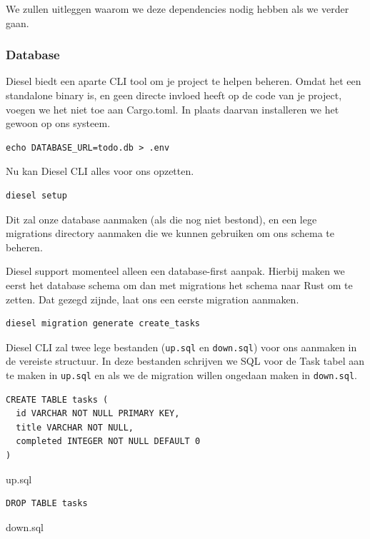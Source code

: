 We zullen uitleggen waarom we deze dependencies nodig hebben als we verder gaan.

\subsubsection{Database}

Diesel biedt een aparte CLI tool om je project te helpen beheren. Omdat het een standalone binary
is, en geen directe invloed heeft op de code van je project, voegen we het niet toe aan Cargo.toml.
In plaats daarvan installeren we het gewoon op ons systeem.

\begin{verbatim}
echo DATABASE_URL=todo.db > .env
\end{verbatim}

Nu kan Diesel CLI alles voor ons opzetten.

\begin{verbatim}
diesel setup
\end{verbatim}

Dit zal onze database aanmaken (als die nog niet bestond), en een lege migrations directory aanmaken
die we kunnen gebruiken om ons schema te beheren.

Diesel support momenteel alleen een database-first aanpak. Hierbij maken we eerst het database
schema om dan met migrations het schema naar Rust om te zetten. Dat gezegd zijnde, laat ons een
eerste migration aanmaken.

\begin{verbatim}
diesel migration generate create_tasks
\end{verbatim}

Diesel CLI zal twee lege bestanden (\texttt{up.sql} en \texttt{down.sql}) voor
ons aanmaken in de vereiste structuur. In deze bestanden schrijven we SQL voor de Task tabel aan te
maken in \texttt{up.sql} en als we de migration willen ongedaan maken in
\texttt{down.sql}.

\begin{listing}
\begin{verbatim}
CREATE TABLE tasks (
  id VARCHAR NOT NULL PRIMARY KEY,
  title VARCHAR NOT NULL,
  completed INTEGER NOT NULL DEFAULT 0
)
\end{verbatim}
\caption{up.sql}
\end{listing}

\begin{listing}
\begin{verbatim}
DROP TABLE tasks
\end{verbatim}
\caption{down.sql}
\end{listing}

